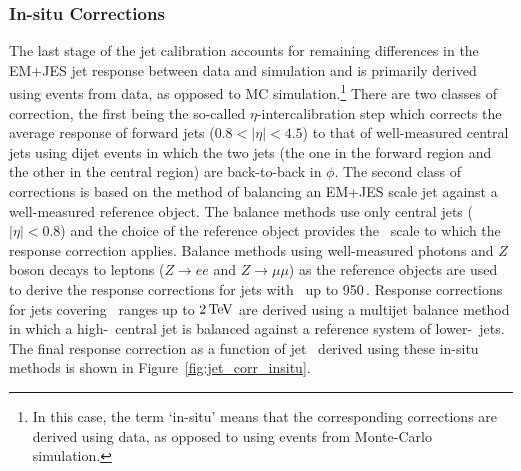 \subsubsection{In-situ Corrections}
\label{sec:jet_in_situ}

The last stage of the jet calibration accounts for remaining differences in the EM+JES jet response between data and simulation
and is primarily derived using events from data, as opposed to MC simulation.\footnote{In this case, the term `in-situ' means
that the corresponding corrections are derived using data, as opposed to using events from Monte-Carlo simulation.}
There are two classes of correction, the first being the so-called $\eta$-intercalibration step which corrects the
average response of forward jets ($0.8 < \lvert \eta \rvert < 4.5$) to that of well-measured central jets using dijet events
in which the two jets (the one in the forward region and the other in the central region) are back-to-back in $\phi$.
The second class of corrections is based on the method of balancing an EM+JES scale jet against a well-measured reference object.
The balance methods use only central jets ($\lvert \eta \rvert < 0.8$) and the choice of the reference object
provides the \pT~scale to which the response correction applies.
Balance methods using well-measured photons and $Z$ boson decays to leptons ($Z \rightarrow ee$ and $Z\rightarrow \mu \mu$)
as the reference objects are used to derive the response corrections for jets with \pT~up to 950\,\GeV.
Response corrections for jets covering \pT~ranges up to $2\,\text{Te\kern -0.1em V}$ are derived using a multijet balance method
in which a high-\pT~central jet is balanced against a reference system of lower-\pT~jets.
The final response correction as a function of jet \pT~derived using these in-situ methods is shown in Figure~\ref{fig:jet_corr_insitu}.

